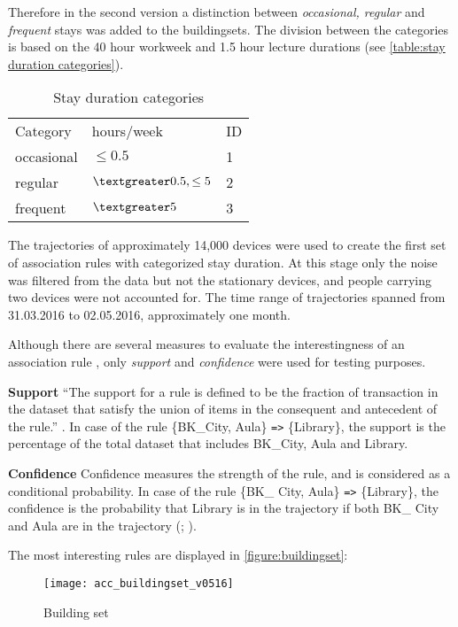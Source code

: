Therefore in the second version a distinction between \textit{occasional,
regular} and \textit{frequent} stays was added to the buildingsets. The division
between the categories is based on the 40 hour workweek and 1.5 hour lecture
durations (see \autoref{table:stay duration categories}). 

\begin{table}[H]
\centering
\captionsetup{justification=centering}
\caption{Stay duration categories}
\label{table:stay duration categories}
\begin{tabular}{lll}
\cline{1-3}
Category   & hours/week             & ID \\ \cline{1-3}
occasional & $\leq 0.5$                 & 1  \\
regular & $\textgreater 0.5, \leq 5$ & 2  \\
frequent   & $\textgreater 5$           & 3
\end{tabular}
\end{table}

The trajectories of approximately 14,000 devices were used to create the first
set of association rules with categorized stay duration. At this stage only the
noise was filtered from the data but not the stationary devices, and people
carrying two devices were not accounted for. The time range of trajectories
spanned from 31.03.2016 to 02.05.2016, approximately one month.

Although there are several measures to evaluate the interestingness of an
association rule \parencite{zhang_survey_2009}, only \textit{support} and
\textit{confidence} were used for testing purposes.

\textbf{Support}
“The support for a rule is defined to be the fraction of transaction in the
dataset that satisfy the union of items in the consequent and antecedent of the
rule.” \parencite{agrawal_mining_1993}. In case of the rule \{BK\_City, Aula\}
\verb|=>| \{Library\}, the support is the percentage of the total dataset that
includes BK\_City, Aula and Library.

\textbf{Confidence}
Confidence measures the strength of the rule, and is considered as a
conditional probability. In case of the rule \{BK\_ City, Aula\} \verb|=>|
\{Library\}, the confidence is the probability that Library is in the
trajectory if both BK\_ City and Aula are in the trajectory
(\cite{agrawal_mining_1993}; \cite{anbukkarasy_interesting_2013}).

The most interesting rules are displayed in \autoref{figure:buildingset}:
\begin{figure}[H]
\centering
\texttt{[image: acc\_buildingset\_v0516]}
\captionsetup{justification=centering}
\caption{Building set}
\label{figure:buildingset}
\end{figure}

